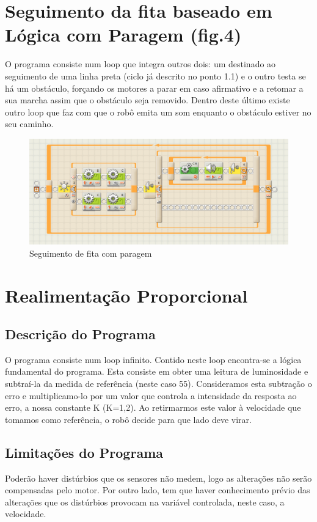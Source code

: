\documentclass{article}
\begin{document}
\section{Seguimento da fita baseado em Lógica com Paragem (fig.4)}
O programa consiste num loop que integra outros dois: um destinado ao seguimento
de uma linha preta (ciclo já descrito no ponto 1.1) e o outro testa se há um
obstáculo, forçando os motores a parar em caso afirmativo e a retomar a sua
marcha assim que o obstáculo seja removido. Dentro deste último existe outro
loop que faz com que o robô emita um som enquanto o obstáculo estiver no seu
caminho.
\begin{figure}[H]
    \centering
    \includegraphics[scale=.5]{logica-paragem}
    \caption{Seguimento de fita com paragem}
\end{figure}

\section{Realimentação Proporcional}
\subsection{Descrição do Programa}
O programa consiste num loop infinito. Contido neste loop encontra-se a lógica
fundamental do programa. Esta consiste em obter uma leitura de luminosidade e
subtraí-la da medida de referência (neste caso 55). Consideramos esta subtração
o erro e multiplicamo-lo por um valor que controla a intensidade da resposta ao
erro, a nossa constante K (K=1,2). Ao retirmarmos este valor à velocidade que
tomamos como referência, o robô decide para que lado deve virar.
\subsection{Limitações do Programa}
Poderão haver distúrbios que os sensores não medem, logo as alterações não serão
compensadas pelo motor. Por outro lado, tem que haver conhecimento prévio das
alterações que os distúrbios provocam na variável controlada, neste caso,
 a velocidade.
\end{document}
